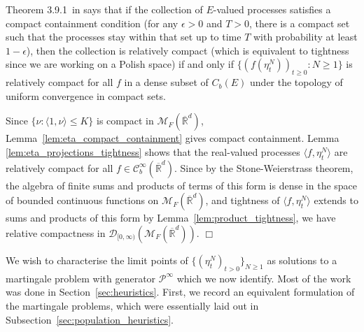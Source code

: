 \documentclass[12pt]{article}
\newenvironment {proof}{{\noindent\bf Proof }}{\hfill $\Box$ \medskip}
\newcommand{\IR}{\mathbb R}
\newcommand{\Pgen}{\mathcal{P}}    %
\newcommand{\cmeasures}{\mathcal{M}_F(\overline{\IR}^d)} %
\numberwithin{equation}{section}
\begin{document}
\begin{proof}
    Theorem 3.9.1~in \cite{ethier/kurtz:1986}
    says that if the collection of $E$-valued processes
    satisfies a compact containment condition
    (for any $\epsilon > 0$ and $T>0$, there is a compact set
    such that the processes stay within that set up to time $T$ with probability at least $1-\epsilon$),
    then the collection is relatively compact (which is equivalent to tightness
since we are working on a Polish space)
    if and only if
    $\{(f(\eta^{N}_t))_{t \geq 0}: N \geq 1\}$ is relatively compact
    for all $f$ in a dense subset of $C_b(E)$
    under the topology of uniform convergence in compact sets.

Since $\{ \nu: \langle 1, \nu \rangle \leq K \} $ is compact in $\cmeasures$,
    Lemma~\ref{lem:eta_compact_containment}
    gives compact containment.
    Lemma \ref{lem:eta_projections_tightness}
    shows that the real-valued processes $\langle f, \eta^{N}_t \rangle$
    are relatively compact for all 
$f \in \mathcal{C}^{\infty}_{b}(\overline{\IR}^d)$.
    Since by the Stone-Weierstrass theorem,
    the algebra of finite sums and products of terms of this form
    is dense in the space of bounded continuous functions on $\cmeasures$,
    and tightness of $\langle f, \eta_t^N \rangle$ extends to sums and products of this form
    by Lemma~\ref{lem:product_tightness},
    we have relative compactness in $\mathcal{D}_{[0,\infty)}(\cmeasures)$.
\end{proof}


We wish to characterise the limit points of
$\{(\eta^{N}_t)_{t>0}\}_{N\geq 1}$ as solutions to a martingale problem 
with generator $\Pgen^{\infty}$ which we now identify. Most of the work
was done in Section~\ref{sec:heuristics}.
First, we record an equivalent formulation
of the martingale problems,
which were essentially laid out in Subsection~\ref{sec:population_heuristics}.
\end{document}
